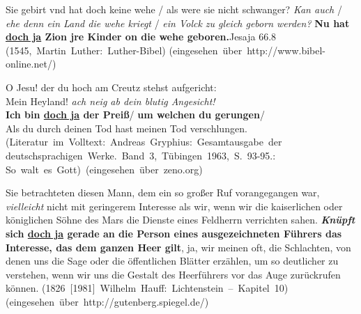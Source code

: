 \begin{exe}
	\ex\label{514} 
	\scriptsize
	Sie gebirt vnd hat doch keine wehe / als were sie nicht schwanger? \emph{Kan auch} / \emph{ehe denn ein Land die wehe kriegt} / 			\emph{ein Volck zu gleich geborn werden?} \textbf{Nu hat \underline{doch ja} Zion jre Kinder on die wehe geboren.}Jesaja 66.8			
	\hfill\hbox{(1545, Martin Luther: Luther-Bibel)}
	\newline
	\hbox{}\hfill\hbox{(eingesehen über http://www.bibel-online.net/)}
\end{exe}
\vspace{-0.65cm}	
\begin{exe}
	\ex\label{515} 
	\scriptsize
	O Jesu! der du hoch am Creutz stehst aufgericht:\\
	Mein Heyland! \emph{ach neig  ab dein blutig Angesicht!}\\
	\textbf{Ich bin \underline{doch ja} der Preiß}/ \textbf{um welchen du gerungen}/\\
	Als du durch deinen Tod hast meinen Tod verschlungen.
	\newline
	\hbox{}\hfill\hbox{(Literatur im Volltext: Andreas Gryphius: Gesamtausgabe der}
	\newline
	\hbox{}\hfill\hbox{deutschsprachigen Werke. Band 3, Tübingen 1963, S. 93-95.:}
	\newline
	\hbox{}\hfill\hbox{So walt es Gott) (eingesehen über zeno.org)}
\end{exe}           
	
\begin{exe}
	\ex\label{516} 
	\scriptsize
	Sie betrachteten diesen Mann, dem ein so großer Ruf vorangegangen war, \emph{vielleicht} nicht mit geringerem Interesse als wir, wenn wir die kaiserlichen oder königlichen Söhne des Mars die Dienste eines Feldherrn verrichten sahen. \textbf{\textit{Knüpft} sich \underline{doch ja} gerade an die Person eines ausgezeichneten Führers das Interesse, das dem ganzen Heer gilt}, ja, wir meinen oft, die Schlachten, von denen uns die Sage oder die öffentlichen Blätter erzählen, um so deutlicher zu verstehen, wenn wir uns die Gestalt des Heerführers vor das Auge zurückrufen können.
	\newline
	\hbox{}\hfill\hbox{(1826 $[$1981$]$ Wilhelm Hauff: Lichtenstein – Kapitel 10)}
	\newline
	\hbox{}\hfill\hbox{(eingesehen über http://gutenberg.spiegel.de/)}
\end{exe}		
							  
